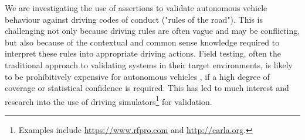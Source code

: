 We are investigating the use of assertions to validate autonomous vehicle behaviour against driving codes of conduct ("rules of the road"). 
This is challenging not only because driving rules are often vague and may be conflicting, but also because of the contextual and common sense knowledge required to interpret these rules into appropriate driving actions. 
%
Field testing, often the traditional approach to validating systems in their target environments, is likely to be prohibitively expensive for autonomous vehicles
, if a high degree of coverage or statistical confidence is required. This has led to much interest and research into the use of driving simulators\footnote{Examples include \url{https://www.rfpro.com} and \url{http://carla.org}.} for validation. 
%
%
%
%

